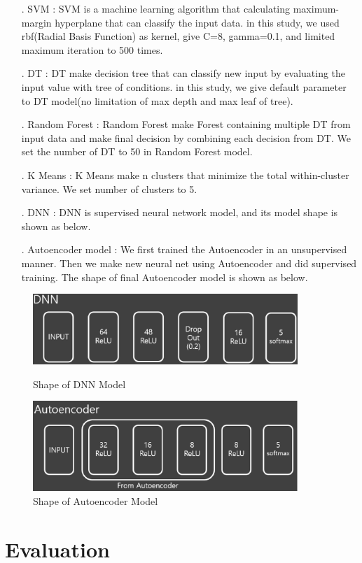 \documentclass[fontsize=10pt]{article}
\begin{document}
\begin{itemize}
    \item [.] SVM : SVM is a machine learning algorithm that calculating maximum-margin hyperplane that can classify the input data. in this study, we used rbf(Radial Basis Function) as kernel, give C=8, gamma=0.1, and limited maximum iteration to 500 times.
    \item [.] DT : DT make decision tree that can classify new input by evaluating the input value with tree of conditions. in this study, we give default parameter to DT model(no limitation of max depth and max leaf of tree).
    \item [.] Random Forest : Random Forest make Forest containing multiple DT from input data and make final decision by combining each decision from DT. We set the number of DT to 50 in Random Forest model.
    \item [.] K Means : K Means make n clusters that minimize the total within-cluster variance. We set number of clusters to 5.
    \item [.] DNN : DNN is supervised neural network model, and its model shape is shown as below.
    \item [.] Autoencoder model : We first trained the Autoencoder in an unsupervised manner. Then we make new neural net using Autoencoder and did supervised training. The shape of final Autoencoder model is shown as below.
\end{itemize}
\begin{figure}[!htbp]
\centering
   \includegraphics[width=10cm]{DNN.eps}
   \hfil
\caption{Shape of DNN Model}
\label{DNNModel}
\centering
   \includegraphics[width=10cm]{Autoencoder.eps}
   \hfil
\caption{Shape of Autoencoder Model}
\label{AutoencoderModel}
\end{figure}


\section{Evaluation}
\label{eval}
\end{document}
